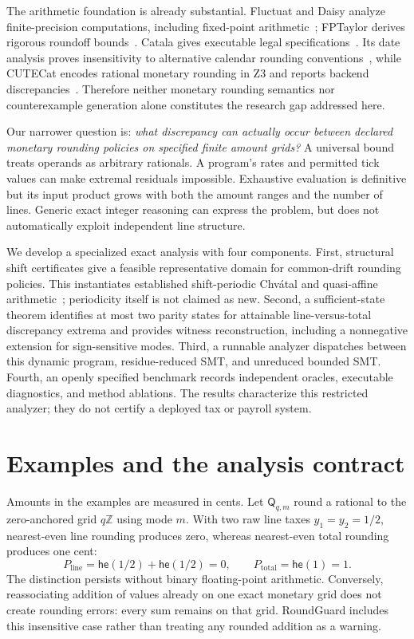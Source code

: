 \documentclass[11pt]{article}
\newcommand{\Q}{\mathsf{Q}}
\newcommand{\he}{\mathsf{he}}
\newcommand{\Z}{\mathbb Z}
\begin{document}
The arithmetic foundation is already substantial. Fluctuat and Daisy analyze finite-precision computations, including fixed-point arithmetic~\citep{fluctuat2011,daisy2018}; FPTaylor derives rigorous roundoff bounds~\citep{fptaylor2015}. Catala gives executable legal specifications~\citep{catala2021}. Its date analysis proves insensitivity to alternative calendar rounding conventions~\citep{date2024}, while CUTECat encodes rational monetary rounding in Z3 and reports backend discrepancies~\citep{cutecat2025}. Therefore neither monetary rounding semantics nor counterexample generation alone constitutes the research gap addressed here.

Our narrower question is: \emph{what discrepancy can actually occur between declared monetary rounding policies on specified finite amount grids?} A universal bound treats operands as arbitrary rationals. A program's rates and permitted tick values can make extremal residuals impossible. Exhaustive evaluation is definitive but its input product grows with both the amount ranges and the number of lines. Generic exact integer reasoning can express the problem, but does not automatically exploit independent line structure.

We develop a specialized exact analysis with four components. First, structural shift certificates give a feasible representative domain for common-drift rounding policies. This instantiates established shift-periodic Chv\'atal and quasi-affine arithmetic~\citep{williams2011,basu_et_al2019,verdoolaege2010}; periodicity itself is not claimed as new. Second, a sufficient-state theorem identifies at most two parity states for attainable line-versus-total discrepancy extrema and provides witness reconstruction, including a nonnegative extension for sign-sensitive modes. Third, a runnable analyzer dispatches between this dynamic program, residue-reduced SMT, and unreduced bounded SMT. Fourth, an openly specified benchmark records independent oracles, executable diagnostics, and method ablations. The results characterize this restricted analyzer; they do not certify a deployed tax or payroll system.

\section{Examples and the analysis contract}
Amounts in the examples are measured in cents. Let $\Q_{q,m}$ round a rational to the zero-anchored grid $q\Z$ using mode $m$. With two raw line taxes $y_1=y_2=1/2$, nearest-even line rounding produces zero, whereas nearest-even total rounding produces one cent:
\[
 P_{\mathrm{line}}=\he(1/2)+\he(1/2)=0,
 \qquad P_{\mathrm{total}}=\he(1)=1.
\]
The distinction persists without binary floating-point arithmetic. Conversely, reassociating addition of values already on one exact monetary grid does not create rounding errors: every sum remains on that grid. RoundGuard includes this insensitive case rather than treating any rounded addition as a warning.
\end{document}
